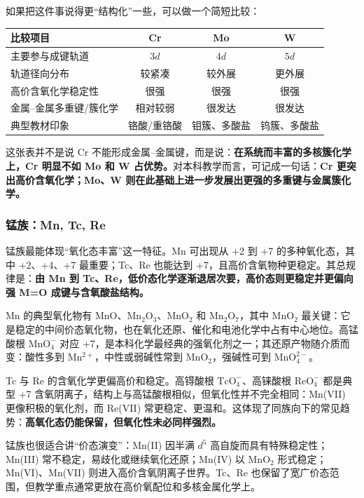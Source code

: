 \documentclass[UTF8]{ctexbook}
\begin{document}
如果把这件事说得更“结构化”一些，可以做一个简短比较：

\renewcommand{\arraystretch}{1.15}
\noindent\begin{tabular*}{\textwidth}{@{\extracolsep{\fill}}lccc@{}}
\toprule
比较项目 & Cr & Mo & W \\
\midrule
主要参与成键轨道 & $3d$ & $4d$ & $5d$ \\
轨道径向分布 & 较紧凑 & 较外展 & 更外展 \\
高价含氧化学稳定性 & 很强 & 很强 & 很强 \\
金属--金属多重键/簇化学 & 相对较弱 & 很发达 & 很发达 \\
典型教材印象 & 铬酸/重铬酸 & 钼簇、多酸盐 & 钨簇、多酸盐 \\
\bottomrule
\end{tabular*}
\renewcommand{\arraystretch}{1.0}

这张表并不是说 Cr 不能形成金属--金属键，而是说：\textbf{在系统而丰富的多核簇化学上，Cr 明显不如 Mo 和 W 占优势。}对本科教学而言，可记成一句话：\textbf{Cr 更突出高价含氧化学；Mo、W 则在此基础上进一步发展出更强的多重键与金属簇化学。}

\subsubsection{锰族：Mn, Tc, Re}

锰族最能体现“氧化态丰富”这一特征。Mn 可出现从 +2 到 +7 的多种氧化态，其中 +2、+4、+7 最重要；Tc、Re 也能达到 +7，且高价含氧物种更稳定。其总规律是：\textbf{由 Mn 到 Tc、Re，低价态化学逐渐退居次要，高价态则更稳定并更偏向强 M{=}O 成键与含氧酸盐结构。}

Mn 的典型氧化物有 $\mathrm{MnO}$、$\mathrm{Mn_2O_3}$、$\mathrm{MnO_2}$ 和 $\mathrm{Mn_2O_7}$，其中 $\mathrm{MnO_2}$ 最关键：它是稳定的中间价态氧化物，也在氧化还原、催化和电池化学中占有中心地位。高锰酸根 $\mathrm{MnO_4^-}$ 对应 +7，是本科化学最经典的强氧化剂之一；其还原产物随介质而变：酸性多到 $\mathrm{Mn^{2+}}$，中性或弱碱性常到 $\mathrm{MnO_2}$，强碱性可到 $\mathrm{MnO_4^{2-}}$。

Tc 与 Re 的含氧化学更偏高价和稳定。高锝酸根 $\mathrm{TcO_4^-}$、高铼酸根 $\mathrm{ReO_4^-}$ 都是典型 +7 含氧阴离子，结构上与高锰酸根相似，但氧化性并不完全相同：Mn(VII) 更像积极的氧化剂，而 Re(VII) 常更稳定、更温和。这体现了同族向下的常见趋势：\textbf{高氧化态仍能保留，但氧化性未必同样强烈。}

锰族也很适合讲“价态演变”：Mn(II) 因半满 $d^5$ 高自旋而具有特殊稳定性；Mn(III) 常不稳定，易歧化或继续氧化还原；Mn(IV) 以 $\mathrm{MnO_2}$ 形式稳定；Mn(VI)、Mn(VII) 则进入高价含氧阴离子世界。Tc、Re 也保留了宽广价态范围，但教学重点通常更放在高价氧配位和多核金属化学上。
\end{document}
